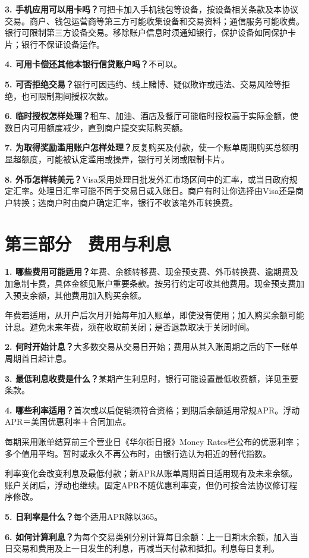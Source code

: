 \documentclass[UTF8,fontset=none,11pt,a4paper]{ctexart}
\begin{document}
\textbf{3. 手机应用可以用卡吗？}可把卡加入手机钱包等设备，按设备相关条款及本协议交易。商户、钱包运营商等第三方可能收集设备和交易资料；通信服务可能收费。银行可限制第三方设备交易。移除账户信息时须通知银行，保护设备如同保护卡片；银行不保证设备运作。


\textbf{4. 可用卡偿还其他本银行信贷账户吗？}不可以。


\textbf{5. 可否拒绝交易？}银行可因违约、线上赌博、疑似欺诈或违法、交易风险等拒绝，也可限制期间授权次数。


\textbf{6. 临时授权怎样处理？}租车、加油、酒店及餐厅可能临时授权高于实际金额，使数日内可用额度减少，直到商户提交实际购买额。


\textbf{7. 为取得奖励滥用账户怎样处理？}反复购买及付款，使一个账单周期购买总额明显超额度，可能被认定滥用或操弄，银行可关闭或限制卡片。


\textbf{8. 外币怎样转美元？}Visa采用处理日批发外汇市场区间中的汇率，或当日政府规定汇率。处理日汇率可能不同于交易日或入账日。商户有时让你选择由Visa还是商户转换；选商户时由商户确定汇率，银行不收该笔外币转换费。


\section*{第三部分　费用与利息}
\textbf{1. 哪些费用可能适用？}年费、余额转移费、现金预支费、外币转换费、逾期费及加急制卡费，具体金额见账户重要条款。按另行约定可收其他费用。现金预支费加入预支余额，其他费用加入购买余额。


年费若适用，从开户后次月开始每年加入账单，即使没有使用；加入购买余额可能计息。避免未来年费，须在收取前关闭；是否退款取决于关闭时间。


\textbf{2. 何时开始计息？}大多数交易从交易日开始；费用从其入账周期之后的下一账单周期首日起计息。


\textbf{3. 最低利息收费是什么？}某期产生利息时，银行可能设置最低收费额，详见重要条款。


\textbf{4. 哪些利率适用？}首次或以后促销须符合资格；到期后余额适用常规APR。浮动APR＝美国优惠利率＋合同加点。


每期采用账单结算前三个营业日《华尔街日报》Money Rates栏公布的优惠利率；多个值用平均。暂时或永久不再公布时，由银行选认为相近的替代指数。


利率变化会改变利息及最低付款；新APR从账单周期首日适用现有及未来余额。账户关闭后，浮动也继续。固定APR不随优惠利率变，但仍可按合法协议修订程序修改。


\textbf{5. 日利率是什么？}每个适用APR除以365。


\textbf{6. 如何计算利息？}为每个交易类别分别计算每日余额：上一日期末余额，加入当日交易和费用及上一日发生的利息，再减当天付款和抵扣。利息每日复利。
\end{document}
